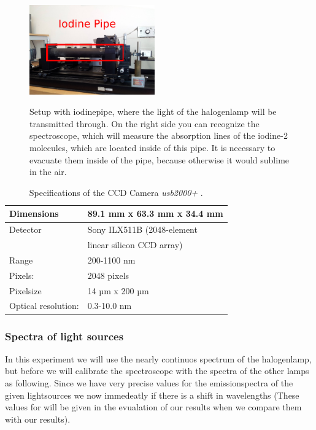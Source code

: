 \begin{figure}
    \caption{Setup with iodinepipe, where the light of the
        halogenlamp will be transmitted through. On the right side
        you can recognize the spectroscope, which will measure
        the absorption lines of the iodine-2 molecules, which
        are located inside of this pipe. It is necessary
        to evacuate them inside of the pipe, because otherwise it
        would sublime in the air.
        } 
    \includegraphics[width=0.48\textwidth]{pics/const2}
 \label{fig:const2}
\end{figure}

\begin{table}
    \caption{Specifications of the  CCD Camera \textit{usb2000+}
        \cite{usb2000_site}.}
\begin{tabular}{| l | l |}
    \hline
    Dimensions & 89.1 mm x 63.3 mm x 34.4 mm \\ 
    \hline
    Detector & Sony ILX511B (2048-element \\
             & linear silicon CCD array) \\  
    \hline
    Range & 200-1100 nm \\ 
    \hline
    Pixels: & 2048 pixels \\ 
    \hline
    Pixelsize & 14 µm x 200 µm \\ 
    \hline
    Optical resolution: & 0.3-10.0 nm \\ 
    \hline
\end{tabular}
\label{tab:ccd}
\end{table}

\subsubsection{Spectra of light sources}
In this experiment we will use the nearly continuos spectrum of
the halogenlamp, but before we will calibrate the spectroscope
with the spectra of the other lamps as following.
Since we have very precise values for the emissionspectra of 
the given lightsources \cite{nist} we now immedeatly if
there is a shift in wavelengths (These values for will be given
in the evualation of our results when we compare them with our
results).


